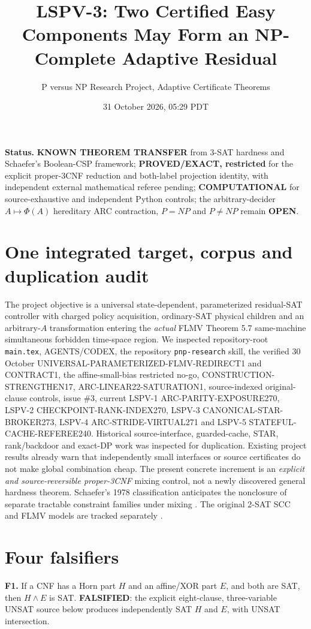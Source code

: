 \documentclass[11pt]{article}
\title{LSPV-3: Two Certified Easy Components May Form an NP-Complete Adaptive Residual}
\author{P versus NP Research Project, Adaptive Certificate Theorems}
\date{31 October 2026, 05:29 PDT}
\begin{document}
\maketitle
\noindent\textbf{Status.} \textbf{KNOWN THEOREM TRANSFER} from 3-SAT hardness and Schaefer's Boolean-CSP framework; \textbf{PROVED/EXACT, restricted} for the explicit proper-3CNF reduction and both-label projection identity, with independent external mathematical referee pending; \textbf{COMPUTATIONAL} for source-exhaustive and independent Python controls; the arbitrary-decider $A\mapsto\Phi(A)$ hereditary ARC contraction, $P=NP$ and $P\ne NP$ remain \textbf{OPEN}.

\section{One integrated target, corpus and duplication audit}
The project objective is a universal state-dependent, parameterized residual-SAT controller with charged policy acquisition, ordinary-SAT physical children and an arbitrary-$A$ transformation entering the \emph{actual} FLMV Theorem 5.7 same-machine simultaneous forbidden time-space region. We inspected repository-root \texttt{main.tex}, AGENTS/CODEX, the repository \texttt{pnp-research} skill, the verified 30 October UNIVERSAL-PARAMETERIZED-FLMV-REDIRECT1 and CONTRACT1, the affine-small-bias restricted no-go, CONSTRUCTION-STRENGTHEN17, ARC-LINEAR22-SATURATION1, source-indexed original-clause controls, issue \#3, current LSPV-1 ARC-PARITY-EXPOSURE270, LSPV-2 CHECKPOINT-RANK-INDEX270, LSPV-3 CANONICAL-STAR-BROKER273, LSPV-4 ARC-STRIDE-VIRTUAL271 and LSPV-5 STATEFUL-CACHE-REFEREE240. Historical source-interface, guarded-cache, STAR, rank/backdoor and exact-DP work was inspected for duplication. Existing project results already warn that independently small interfaces or source certificates do not make global combination cheap. The present concrete increment is an \emph{explicit and source-reversible proper-3CNF} mixing control, not a newly discovered general hardness theorem. Schaefer's 1978 classification anticipates the nonclosure of separate tractable constraint families under mixing \cite{schaefer}. The original 2-SAT SCC and FLMV models are tracked separately \cite{aspvall,flmv}.

\section{Four falsifiers}
\noindent\textbf{F1.} If a CNF has a Horn part $H$ and an affine/XOR part $E$, and both are SAT, then $H\wedge E$ is SAT. \textbf{FALSIFIED}: the explicit eight-clause, three-variable UNSAT source below produces independently SAT $H$ and $E$, with UNSAT intersection.
\end{document}
